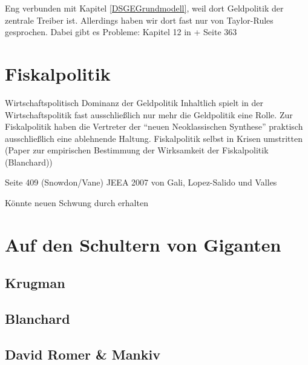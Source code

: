 Eng verbunden mit Kapitel \ref{DSGEGrundmodell}, weil dort Geldpolitik der zentrale Treiber ist. Allerdings haben wir dort fast nur von Taylor-Rules gesprochen. Dabei gibt es Probleme: Kapitel 12 in \textcite{Romer2019} + Seite 363

\section{Fiskalpolitik}
\label{NeueFiskal}

Wirtschaftspolitisch Dominanz der Geldpolitik
Inhaltlich spielt in der Wirtschaftspolitik fast ausschließlich nur mehr die Geldpolitik eine Rolle. Zur Fiskalpolitik haben die Vertreter der "`neuen Neoklassischen Synthese"' praktisch ausschließlich eine ablehnende Haltung.
Fiskalpolitik selbst in Krisen umstritten (Paper zur empirischen Bestimmung der Wirksamkeit der Fiskalpolitik (Blanchard))

\textcite[S. 130]{Christiano2018}




Seite 409 (Snowdon/Vane)
\parencite{Woodford2011}
JEEA 2007 von Gali, Lopez-Salido und Valles 

Könnte neuen Schwung durch \textcite{Kaplan2018} erhalten

\section{Auf den Schultern von Giganten}
\label{Giganten}

\subsection{Krugman}

\subsection{Blanchard}

\subsection{David Romer \& Mankiv}










